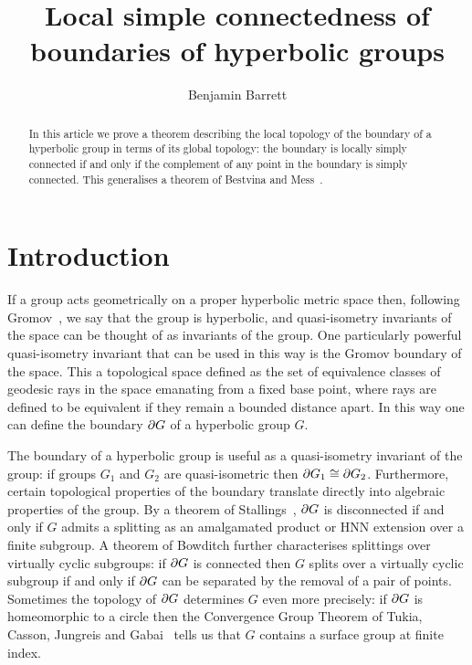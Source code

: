 \documentclass[a4paper]{article}
\title{Local simple connectedness of boundaries of hyperbolic groups}
\author{Benjamin Barrett}
\begin{document}
\maketitle

\begin{abstract}
  In this article we prove a theorem describing the local topology of the
  boundary of a hyperbolic group in terms of its global topology: the boundary
  is locally simply connected if and only if the complement of any point in the
  boundary is simply connected. This generalises a theorem of Bestvina and
  Mess~\cite{bestvinamess91}.
\end{abstract}

\section{Introduction}

If a group acts geometrically on a proper hyperbolic metric space then,
following Gromov~\cite{gromov87}, we say that the group is hyperbolic, and
quasi-isometry invariants of the space can be thought of as invariants of the
group. One particularly powerful quasi-isometry invariant that can be used in
this way is the Gromov boundary of the space. This a topological space defined
as the set of equivalence classes of geodesic rays in the space emanating from
a fixed base point, where rays are defined to be equivalent if they remain a
bounded distance apart. In this way one can define the boundary $\partial G$
of a hyperbolic group $G$.

The boundary of a hyperbolic group is useful as a quasi-isometry invariant of
the group: if groups $G_1$ and $G_2$ are quasi-isometric then $\partial G_1
\cong \partial G_2$. Furthermore, certain topological properties of the
boundary translate directly into algebraic properties of the group. By a
theorem of Stallings~\cite{stallings68}, $\partial G$ is disconnected if and
only if $G$ admits a splitting as an amalgamated product or HNN extension over
a finite subgroup. A theorem of Bowditch further characterises splittings over
virtually cyclic subgroups: if $\partial G$ is connected then $G$ splits over
a virtually cyclic subgroup if and only if $\partial G$ can be separated by
the removal of a pair of points. Sometimes the topology of $\partial G$
determines $G$ even more precisely: if $\partial G$ is homeomorphic to a
circle then the Convergence Group Theorem of Tukia, Casson, Jungreis and
Gabai~\cite{tukia88,cassonjungreis94,gabai92} tells us that $G$ contains a
surface group at finite index.
\end{document}
